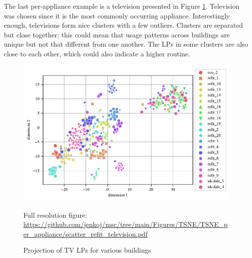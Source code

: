 

The last per-appliance example is a television presented in Figure \ref{fig:tsne_pa_scatter_all_tv}.
Television was chosen since it is the most commonly occurring appliance.
Interestingly enough, televisions form nice clusters with a few outliers.
Clusters are separated but close together; this could mean that usage patterns across buildings are unique but not that different from one another.
The LPs in some clusters are also close to each other, which could also indicate a higher routine.

\begin{figure}[H]
	\centering
	\caption{Projection of TV LPs for various buildings}
	\includegraphics[]{Figures/TSNE/TSNE_per_appliance/scatter_refit_television.pdf}
	\label{fig:tsne_pa_scatter_all_tv}
	\par
	\par\footnotesize{Full resolution figure: \url{https://github.com/jenkoj/msc/tree/main/Figures/TSNE/TSNE_per_appliance/scatter_refit_television.pdf}}
\end{figure}

